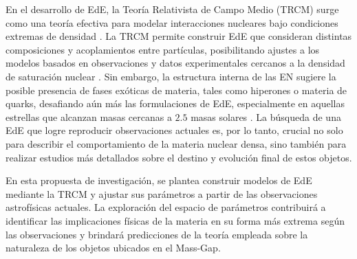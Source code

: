 En el desarrollo de EdE, la Teoría Relativista de Campo Medio (TRCM) surge como una teoría efectiva para modelar interacciones nucleares bajo condiciones extremas de densidad \cite{waleckaTheoryHighlyCondensed1974,waleckaRelativisticNuclearManyBody1986}. La TRCM permite construir EdE que consideran distintas composiciones y acoplamientos entre partículas, posibilitando ajustes a los modelos basados en observaciones y datos experimentales cercanos a la densidad de saturación nuclear \cite{dutraRelativisticMeanFieldHadronic2014}. Sin embargo, la estructura interna de las EN sugiere la posible presencia de fases exóticas de materia, tales como hiperones o materia de quarks, desafiando aún más las formulaciones de EdE, especialmente en aquellas estrellas que alcanzan masas cercanas a $2.5$ masas solares \cite{lopesNatureMassgapObject2022}. La búsqueda de una EdE que logre reproducir observaciones actuales es, por lo tanto, crucial no solo para describir el comportamiento de la materia nuclear densa, sino también para realizar estudios más detallados sobre el destino y evolución final de estos objetos.

En esta propuesta de investigación, se plantea construir modelos de EdE mediante la TRCM y ajustar sus parámetros a partir de las observaciones astrofísicas actuales. La exploración del espacio de parámetros contribuirá a identificar las implicaciones físicas de la materia en su forma más extrema según las observaciones y brindará predicciones de la teoría empleada sobre la naturaleza de los objetos ubicados en el Mass-Gap.










 